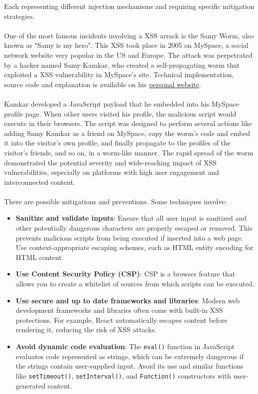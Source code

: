 \documentclass{article}
\begin{document}
Each representing different injection mechanisms and requiring specific mitigation strategies.
\\
\\
One of the most famous incidents involving a XSS arrack is the Samy Worm, also known as "Samy is my hero". This XSS took place in 2005 on MySpace, a social network website very popular in the US and Europe. The attack was perpetrated by a hacker named Samy Kamkar, who created a self-propagating worm that exploited a XSS vulnerability in MySpace's site. Technical implementation, source code and explanation is available on his \href{https://samy.pl/myspace/}{personal website}.
\\
\\
Kamkar developed a JavaScript payload that he embedded into his MySpace profile page. When other users visited his profile, the malicious script would execute in their browsers. The script was designed to perform several actions like adding Samy Kamkar as a friend on MySpace, copy the worm's code and embed it into the visitor's own profile, and finally propagate to the profiles of the visitor's friends, and so on, in a worm-like manner.
The rapid spread of the worm demonstrated the potential severity and wide-reaching impact of XSS vulnerabilities, especially on platforms with high user engagement and interconnected content.
\\
\\
There are possible mitigations and preventions. Some techniques involve:
\\
\begin{itemize}
	\item \textbf{Sanitize and validate inputs}: Ensure that all user input is sanitized and other potentially dangerous characters are properly escaped or removed. This prevents malicious scripts from being executed if inserted into a web page. Use context-appropriate escaping schemes, such as HTML entity encoding for HTML content.
	\item \textbf{Use Content Security Policy (CSP)}: CSP is a browser feature that allows you to create a whitelist of sources from which scripts can be executed.
	\item \textbf{Use secure and up to date frameworks and libraries}: Modern web development frameworks and libraries often come with built-in XSS protections. For example, React automatically escapes content before rendering it, reducing the risk of XSS attacks.
	\item \textbf{Avoid dynamic code evaluation}: The \texttt{eval()} function in JavaScript evaluates code represented as strings, which can be extremely dangerous if the strings contain user-supplied input. Avoid its use and similar functions like \texttt{setTimeout()}, \texttt{setInterval()}, and \texttt{Function()} constructors with user-generated content.
\end{itemize}
\end{document}
